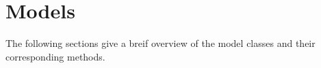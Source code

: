 
%
%
%


\chapter{Models}
\label{MODELS CHAPTER}

The following sections give a breif overview of the model classes and their corresponding methods.

 
%


%




